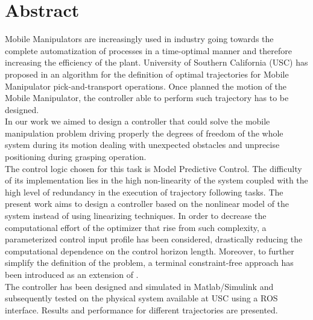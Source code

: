	\newpage
\chapter*{Abstract}

Mobile Manipulators are increasingly used in industry going towards the complete automatization of processes in a time-optimal manner and therefore increasing the efficiency of the plant. University of Southern California (USC) has proposed in \cite{shantanuthakar} an algorithm for the definition of optimal trajectories for Mobile Manipulator pick-and-transport operations. Once planned the motion of the Mobile Manipulator, the controller able to perform such trajectory has to be designed. \\
In our work we aimed to design a controller that could solve the mobile manipulation problem driving properly the degrees of freedom of the whole system during its motion dealing with unexpected obstacles and unprecise positioning during grasping operation.\\
The control logic chosen for this task is Model Predictive Control. The difficulty of its implementation lies in the high non-linearity of the system coupled with the high level of redundancy in the execution of trajectory following tasks. The present work aims to design a controller based on the nonlinear model of the system instead of using linearizing techniques. In order to decrease the computational effort of the optimizer that rise from such complexity, a parameterized control input profile has been considered, drastically reducing the computational dependence on the control horizon length. Moreover, to further simplify the definition of the problem, a terminal constraint-free approach has been introduced as an extension of \cite{alamir2018stability}. \\
The controller has been designed and simulated in Matlab/Simulink and subsequently tested on the physical system available at USC using a ROS interface. Results and performance for different trajectories are presented.  

\vspace{0.5cm}
\noindent 
